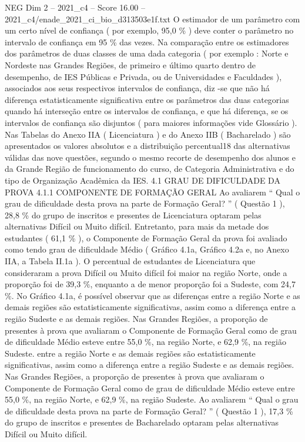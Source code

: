 \begin{textsample}{NEG Dim 2 – 2021\_c4 – Score 16.00 – 2021\_c4/enade\_2021\_ci\_bio\_d313503e1f.txt}
O estimador de um parâmetro com um certo nível de confiança ( por exemplo, 95,0 \% ) deve conter o parâmetro no intervalo de confiança em 95 \% das vezes.
Na comparação entre os estimadores dos parâmetros de duas classes de uma dada categoria ( por exemplo : Norte e Nordeste nas Grandes Regiões, de primeiro e último quarto dentro de desempenho, de IES Públicas e Privada, ou de Universidades e Faculdades ), associados aos seus respectivos intervalos de confiança, diz -se que não há diferença estatisticamente significativa entre os parâmetros das duas categorias quando há interseção entre os intervalos de confiança, e que há diferença, se os intervalos de confiança são disjuntos ( para maiores informações vide Glossário ).
Nas Tabelas do Anexo IIA ( Licenciatura ) e do Anexo IIB ( Bacharelado ) são apresentados os valores absolutos e a distribuição percentual18 das alternativas válidas das nove questões, segundo o mesmo recorte de desempenho dos alunos e da Grande Região de funcionamento do curso, de Categoria Administrativa e do tipo de Organização Acadêmica da IES. 4.1 GRAU DE DIFICULDADE DA PROVA 4.1.1 COMPONENTE DE FORMAÇÃO GERAL Ao avaliarem “ Qual o grau de dificuldade desta prova na parte de Formação Geral? ” ( Questão 1 ), 28,8 \% do grupo de inscritos e presentes de Licenciatura optaram pelas alternativas Difícil ou Muito difícil.
Entretanto, para mais da metade dos estudantes ( 61,1 \% ), o Componente de Formação Geral da prova foi avaliado como tendo grau de dificuldade Médio ( Gráfico 4.1a, Gráfico 4.2a e, no Anexo IIA, a Tabela II.1a ).
O percentual de estudantes de Licenciatura que consideraram a prova Difícil ou Muito difícil foi maior na região Norte, onde a proporção foi de 39,3 \%, enquanto a de menor proporção foi a Sudeste, com 24,7 \%.
No Gráfico 4.1a, é possível observar que as diferenças entre a região Norte e as demais regiões são estatisticamente significativas, assim como a diferença entre a região Sudeste e as demais regiões.
Nas Grandes Regiões, a proporção de presentes à prova que avaliaram o Componente de Formação Geral como de grau de dificuldade Médio esteve entre 55,0 \%, na região Norte, e 62,9 \%, na região Sudeste. entre a região Norte e as demais regiões são estatisticamente significativas, assim como a diferença entre a região Sudeste e as demais regiões.
Nas Grandes Regiões, a proporção de presentes à prova que avaliaram o Componente de Formação Geral como de grau de dificuldade Médio esteve entre 55,0 \%, na região Norte, e 62,9 \%, na região Sudeste.
Ao avaliarem “ Qual o grau de dificuldade desta prova na parte de Formação Geral? ” ( Questão 1 ), 17,3 \% do grupo de inscritos e presentes de Bacharelado optaram pelas alternativas Difícil ou Muito difícil.

\end{textsample}
